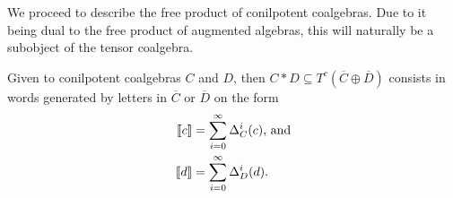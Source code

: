 \documentclass[../thesis.tex]{subfiles}
\begin{document}
                We proceed to describe the free product of conilpotent coalgebras. Due to it being dual to the free product of augmented algebras, this will naturally be a subobject of the tensor coalgebra.

                \begin{lemma}
                    Given to conilpotent coalgebras $C$ and $D$, then $C\ast D \subseteq T^c(\overline{C}\oplus \overline{D})$ consists in words generated by letters in $\overline{C}$ or $\overline{D}$ on the form
                    \begin{align*}
                        \llbracket c \rrbracket & = \sum_{i=0}^\infty \Delta^i_C(c)\tt{, and}\\
                        \llbracket d \rrbracket & = \sum_{i=0}^\infty \Delta^i_D(d)\tt{.}
                    \end{align*} 
                \end{lemma}
\end{document}

